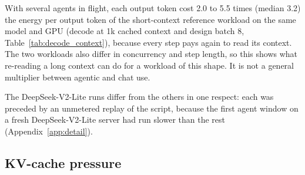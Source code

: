 \documentclass[11pt]{article}
\begin{document}
With several agents in flight, each output token cost 2.0 to 5.5 times (median 3.2) the energy per output token of the short-context reference workload on the same model and GPU (decode at 1k cached context and design batch 8, Table~\ref{tab:decode_context}), because every step pays again to read its context. The two workloads also differ in concurrency and step length, so this shows what re-reading a long context can do for a workload of this shape. It is not a general multiplier between agentic and chat use.

The DeepSeek-V2-Lite runs differ from the others in one respect: each was preceded by an unmetered replay of the script, because the first agent window on a fresh DeepSeek-V2-Lite server had run slower than the rest (Appendix~\ref{app:detail}).

\subsection{KV-cache pressure}\label{sec:kv}
\end{document}
